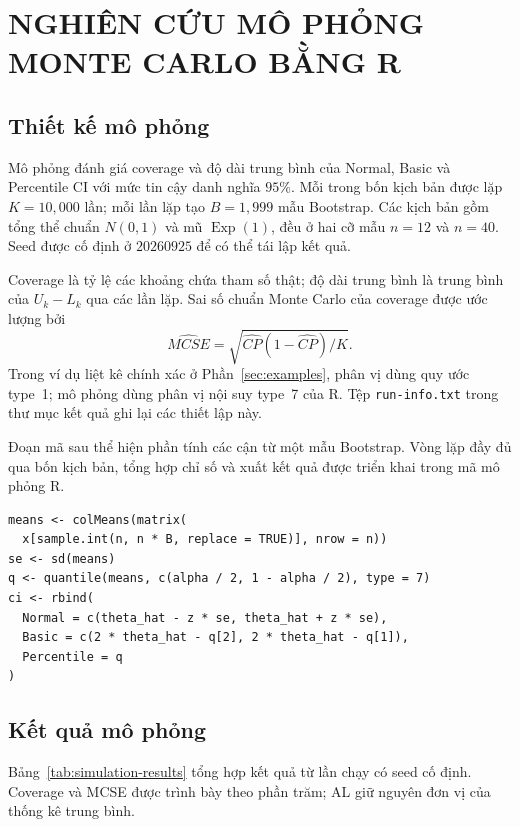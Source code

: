 \section{NGHIÊN CỨU MÔ PHỎNG MONTE CARLO BẰNG R}

\subsection{Thiết kế mô phỏng}

Mô phỏng đánh giá coverage và độ dài trung bình của Normal, Basic và
Percentile CI với mức tin cậy danh nghĩa $95\%$. Mỗi trong bốn kịch bản
được lặp $K=10{,}000$ lần; mỗi lần lặp tạo $B=1{,}999$ mẫu Bootstrap.
Các kịch bản gồm tổng thể chuẩn $N(0,1)$ và mũ $\operatorname{Exp}(1)$,
đều ở hai cỡ mẫu $n=12$ và $n=40$. Seed được cố định ở $20260925$ để có
thể tái lập kết quả.

Coverage là tỷ lệ các khoảng chứa tham số thật; độ dài trung bình là trung
bình của $U_k-L_k$ qua các lần lặp. Sai số chuẩn Monte Carlo của coverage
được ước lượng bởi
\[
\widehat{MCSE}=\sqrt{\widehat{CP}(1-\widehat{CP})/K}.
\]
Trong ví dụ liệt kê chính xác ở Phần~\ref{sec:examples}, phân vị dùng
quy ước type~1; mô phỏng dùng phân vị nội suy type~7 của R. Tệp
\texttt{run-info.txt} trong thư mục kết quả ghi lại các thiết lập này.

Đoạn mã sau thể hiện phần tính các cận từ một mẫu Bootstrap. Vòng lặp đầy
đủ qua bốn kịch bản, tổng hợp chỉ số và xuất kết quả được triển khai trong
mã mô phỏng R.

\begin{lstlisting}[style=Rstyle, caption={Tính các khoảng tin cậy}]
means <- colMeans(matrix(
  x[sample.int(n, n * B, replace = TRUE)], nrow = n))
se <- sd(means)
q <- quantile(means, c(alpha / 2, 1 - alpha / 2), type = 7)
ci <- rbind(
  Normal = c(theta_hat - z * se, theta_hat + z * se),
  Basic = c(2 * theta_hat - q[2], 2 * theta_hat - q[1]),
  Percentile = q
)
\end{lstlisting}

\subsection{Kết quả mô phỏng}

Bảng~\ref{tab:simulation-results} tổng hợp kết quả từ lần chạy có seed cố
định. Coverage và MCSE được trình bày theo phần trăm; AL giữ nguyên đơn vị
của thống kê trung bình.

